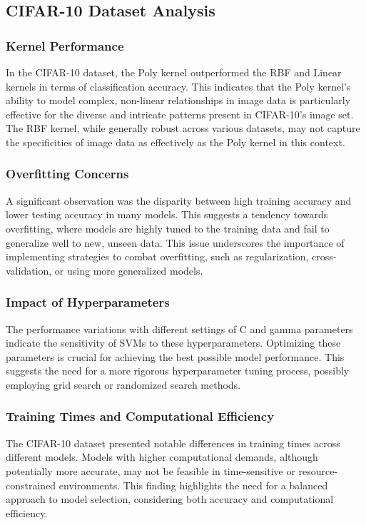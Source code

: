 \documentclass[conference]{IEEEtran}
\begin{document}
\subsection{CIFAR-10 Dataset Analysis}

\subsubsection{Kernel Performance}
In the CIFAR-10 dataset, the Poly kernel outperformed the RBF and Linear kernels in terms of classification accuracy. This indicates that the Poly kernel's ability to model complex, non-linear relationships in image data is particularly effective for the diverse and intricate patterns present in CIFAR-10's image set. The RBF kernel, while generally robust across various datasets, may not capture the specificities of image data as effectively as the Poly kernel in this context.

\subsubsection{Overfitting Concerns}
A significant observation was the disparity between high training accuracy and lower testing accuracy in many models. This suggests a tendency towards overfitting, where models are highly tuned to the training data and fail to generalize well to new, unseen data. This issue underscores the importance of implementing strategies to combat overfitting, such as regularization, cross-validation, or using more generalized models.

\subsubsection{Impact of Hyperparameters}
The performance variations with different settings of C and gamma parameters indicate the sensitivity of SVMs to these hyperparameters. Optimizing these parameters is crucial for achieving the best possible model performance. This suggests the need for a more rigorous hyperparameter tuning process, possibly employing grid search or randomized search methods.

\subsubsection{Training Times and Computational Efficiency}
The CIFAR-10 dataset presented notable differences in training times across different models. Models with higher computational demands, although potentially more accurate, may not be feasible in time-sensitive or resource-constrained environments. This finding highlights the need for a balanced approach to model selection, considering both accuracy and computational efficiency.
\end{document}
